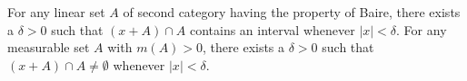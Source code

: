 For any linear set $A$ of second category having the property of Baire, there exists a $\delta > 0$ such that $(x + A) \cap A$ contains an interval whenever $|x| < \delta$. For any measurable set $A$ with $m(A) > 0$, there exists a $\delta > 0$ such that $(x + A) \cap A \neq \emptyset$ whenever $|x| < \delta$.
